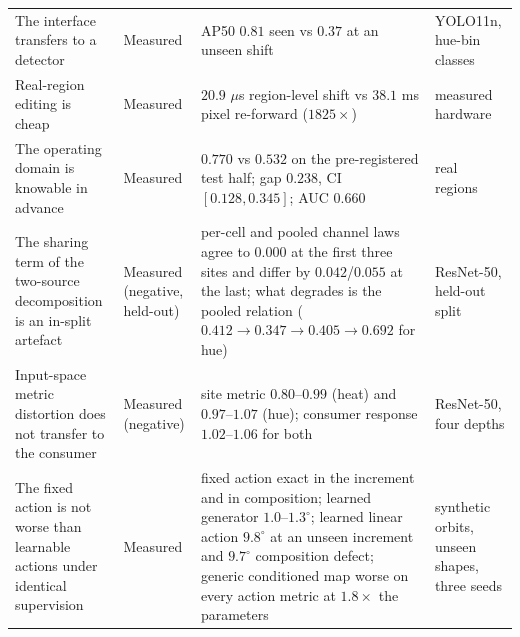 \begin{table}[t]
\begin{tabularx}{\textwidth}{@{}>{\raggedright\arraybackslash}X >{\raggedright\arraybackslash}X >{\raggedright\arraybackslash}X >{\raggedright\arraybackslash}X@{}}
The interface transfers to a detector & Measured & AP50 $0.81$ seen vs $0.37$ at an unseen shift & YOLO11n, hue-bin classes \\
Real-region editing is cheap & Measured & $20.9$ $\mu$s region-level shift vs $38.1$ ms pixel re-forward ($1825\times$) & measured hardware \\
The operating domain is knowable in advance & Measured & $0.770$ vs $0.532$ on the pre-registered test half; gap $0.238$, CI $[0.128,\allowbreak{}0.345]$; AUC $0.660$ & 750 real regions \\
The sharing term of the two-source decomposition is an in-split artefact & Measured (negative, held-out) & per-cell and pooled channel laws agree to $0.000$ at the first three sites and differ by $0.042$/$0.055$ at the last; what degrades is the pooled relation ($0.412\to0.347\to0.405\to0.692$ for hue) & ResNet-50, held-out split \\
Input-space metric distortion does not transfer to the consumer & Measured (negative) & site metric $0.80$--$0.99$ (heat) and $0.97$--$1.07$ (hue); consumer response $1.02$--$1.06$ for both & ResNet-50, four depths \\
The fixed action is not worse than learnable actions under identical supervision & Measured & fixed action exact in the increment and in composition; learned generator $1.0$--$1.3^\circ$; learned linear action $9.8^\circ$ at an unseen increment and $9.7^\circ$ composition defect; generic conditioned map worse on every action metric at $1.8\times$ the parameters & synthetic orbits, unseen shapes, three seeds \\
\bottomrule
\end{tabularx}
\end{table}

